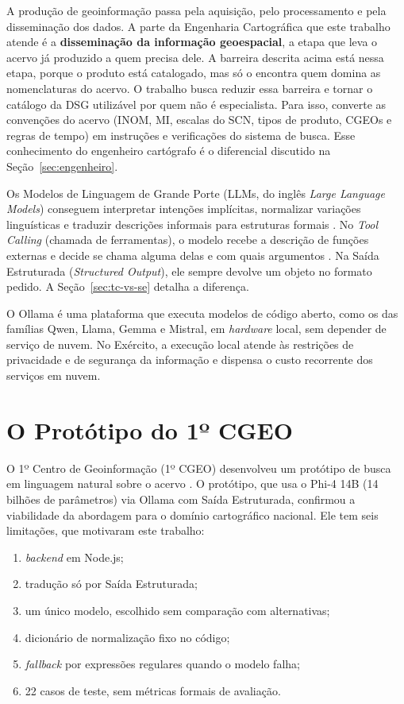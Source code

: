 A produção de geoinformação passa pela aquisição, pelo processamento e pela disseminação dos dados. A parte da Engenharia Cartográfica que este trabalho atende é a \textbf{disseminação da informação geoespacial}, a etapa que leva o acervo já produzido a quem precisa dele. A barreira descrita acima está nessa etapa, porque o produto está catalogado, mas só o encontra quem domina as nomenclaturas do acervo. O trabalho busca reduzir essa barreira e tornar o catálogo da DSG utilizável por quem não é especialista. Para isso, converte as convenções do acervo (INOM, MI, escalas do SCN, tipos de produto, CGEOs e regras de tempo) em instruções e verificações do sistema de busca. Esse conhecimento do engenheiro cartógrafo é o diferencial discutido na Seção~\ref{sec:engenheiro}.

Os Modelos de Linguagem de Grande Porte (LLMs, do inglês \textit{Large Language Models}) conseguem interpretar intenções implícitas, normalizar variações linguísticas e traduzir descrições informais para estruturas formais \cite{brown2020gpt3, wei2022emergent}. No \textit{Tool Calling} (chamada de ferramentas), o modelo recebe a descrição de funções externas e decide se chama alguma delas e com quais argumentos \cite{schick2023toolformer, qin2023toolllm}. Na Saída Estruturada (\textit{Structured Output}), ele sempre devolve um objeto no formato pedido. A Seção~\ref{sec:tc-vs-se} detalha a diferença.

O Ollama \cite{ollama2023} é uma plataforma que executa modelos de código aberto, como os das famílias Qwen, Llama, Gemma e Mistral, em \textit{hardware} local, sem depender de serviço de nuvem. No Exército, a execução local atende às restrições de privacidade e de segurança da informação e dispensa o custo recorrente dos serviços em nuvem.

\section{O Protótipo do 1º CGEO}

O 1º Centro de Geoinformação (1º CGEO) desenvolveu um protótipo de busca em linguagem natural sobre o acervo \cite{cgeo2025prototipo}. O protótipo, que usa o \mbox{Phi-4} 14B (14 bilhões de parâmetros) via Ollama com Saída Estruturada, confirmou a viabilidade da abordagem para o domínio cartográfico nacional. Ele tem seis limitações, que motivaram este trabalho:
\begin{enumerate}
  \item \textit{backend} em Node.js;
  \item tradução só por Saída Estruturada;
  \item um único modelo, escolhido sem comparação com alternativas;
  \item dicionário de normalização fixo no código;
  \item \textit{fallback} por expressões regulares quando o modelo falha;
  \item 22 casos de teste, sem métricas formais de avaliação.
\end{enumerate}


